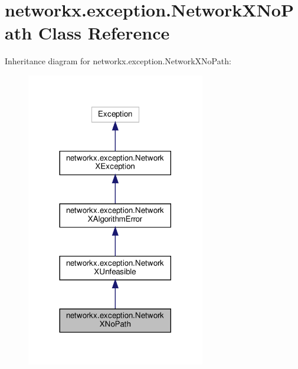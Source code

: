 \hypertarget{classnetworkx_1_1exception_1_1NetworkXNoPath}{}\section{networkx.\+exception.\+Network\+X\+No\+Path Class Reference}
\label{classnetworkx_1_1exception_1_1NetworkXNoPath}


Inheritance diagram for networkx.\+exception.\+Network\+X\+No\+Path\+:
\nopagebreak
\begin{figure}[H]
\begin{center}
\leavevmode
\includegraphics[width=221pt]{classnetworkx_1_1exception_1_1NetworkXNoPath__inherit__graph}
\end{center}
\end{figure}


